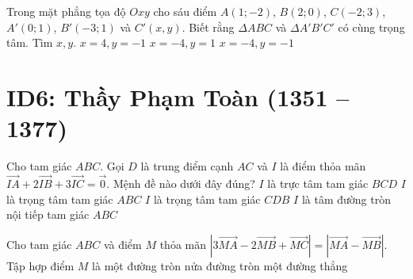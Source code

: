 \begin{ex}%
	Trong mặt phẳng tọa độ $Oxy$ cho sáu điểm $A(1;-2)$, $B(2;0)$, $C(-2;3)$, $A'(0;1)$, $B'(-3;1)$ và $C'(x,y)$. Biết rằng $\Delta ABC$ và $\Delta A'B'C'$ có cùng trọng tâm. Tìm $x,y$.
	{\True $x=4,y=-1$}
	{$x=-4,y=1$}
	{$x=-4,y=-1$}
\end{ex}


\section*{ID6: Thầy Phạm Toàn (1351 -- 1377)}
\begin{ex}%
	Cho tam giác $ABC$. Gọi $D$ là trung điểm cạnh $AC$ và $I$ là điểm thỏa mãn $\vec{IA} +2\vec{IB} +3\vec{IC}=\vec{0}$. Mệnh đề nào dưới đây đúng?
	\choice
	{$I$ là trực tâm tam giác $BCD$}
	{$I$ là trọng tâm tam giác $ABC$}
	{\True $I$ là trọng tâm tam giác $CDB$}
	{$I$ là tâm đường tròn nội tiếp tam giác $ABC$}
\end{ex}
\begin{ex}%
	Cho tam giác $ABC$ và điểm $M$ thỏa mãn $ \left|3\vec{MA}-2\vec{MB}+\vec{MC}\right|=\left|\vec{MA}- \vec{MB}\right|$. Tập hợp điểm $M$ là
	{\True một đường tròn}
	{nửa đường tròn}
	{một đường thẳng}
\end{ex}



